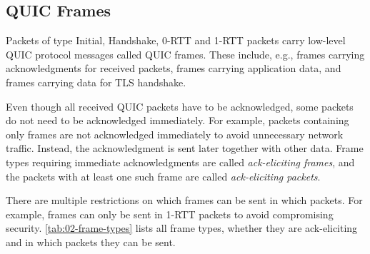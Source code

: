 \subsection{QUIC Frames}

Packets of type Initial, Handshake, 0-RTT and 1-RTT packets carry low-level QUIC protocol messages
called QUIC frames. These include, e.g., \ACK{} frames carrying acknowledgments for received packets,
\STREAM{} frames carrying application data, and \CRYPTO{} frames carrying data for TLS handshake.

Even though all received QUIC packets have to be acknowledged, some packets do not need to be
acknowledged immediately. For example, packets containing only \ACK{} frames are not acknowledged
immediately to avoid unnecessary network traffic. Instead, the acknowledgment is sent later together
with other data. Frame types requiring immediate acknowledgments are called \textit{ack-eliciting
frames}, and the packets with at least one such frame are called \textit{ack-eliciting packets}.

There are multiple restrictions on which frames can be sent in which packets. For example, \STREAM{}
frames can only be sent in 1-RTT packets to avoid compromising security.
\autoref{tab:02-frame-types} lists all frame types, whether they are ack-eliciting and in which
packets they can be sent.

